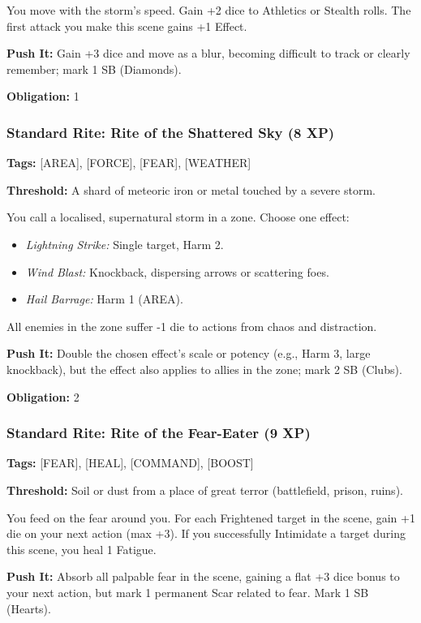 You move with the storm's speed. Gain +2 dice to Athletics or Stealth rolls. The first attack you make this scene gains +1 Effect.

\textbf{Push It:} Gain +3 dice and move as a blur, becoming difficult to track or clearly remember; mark 1 SB (Diamonds).

\textbf{Obligation:} 1

\subsubsection{Standard Rite: Rite of the Shattered Sky (8 XP)}

\textbf{Tags:} [AREA], [FORCE], [FEAR], [WEATHER]

\textbf{Threshold:} A shard of meteoric iron or metal touched by a severe storm.

You call a localised, supernatural storm in a zone. Choose one effect:
\begin{itemize}
\item \textit{Lightning Strike:} Single target, Harm 2.
\item \textit{Wind Blast:} Knockback, dispersing arrows or scattering foes.
\item \textit{Hail Barrage:} Harm 1 (AREA).
\end{itemize}
All enemies in the zone suffer -1 die to actions from chaos and distraction.

\textbf{Push It:} Double the chosen effect's scale or potency (e.g., Harm 3, large knockback), but the effect also applies to allies in the zone; mark 2 SB (Clubs).

\textbf{Obligation:} 2

\subsubsection{Standard Rite: Rite of the Fear-Eater (9 XP)}

\textbf{Tags:} [FEAR], [HEAL], [COMMAND], [BOOST]

\textbf{Threshold:} Soil or dust from a place of great terror (battlefield, prison, ruins).

You feed on the fear around you. For each Frightened target in the scene, gain +1 die on your next action (max +3). If you successfully Intimidate a target during this scene, you heal 1 Fatigue.

\textbf{Push It:} Absorb all palpable fear in the scene, gaining a flat +3 dice bonus to your next action, but mark 1 permanent Scar related to fear. Mark 1 SB (Hearts).

